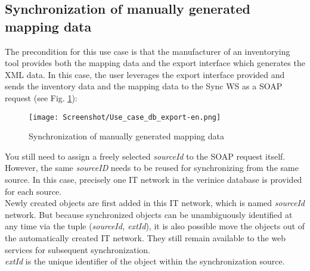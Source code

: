 \documentclass[a4paper,10pt]{book}
\begin{document}
\subsection{Synchronization of manually generated mapping data}
The precondition for this use case is that the manufacturer of an inventorying tool provides both the
mapping data and the export interface which generates the XML data. In this case, the user leverages the export
interface provided and sends the inventory data and the mapping data to the Sync WS as a SOAP request (see Fig. \ref{Synchronization of manually generated mapping data}):
\newline
\begin{figure}[htb!]
  \centering
  \texttt{[image: Screenshot/Use\_case\_db\_export-en.png]}
  \caption{\label{Synchronization of manually generated mapping data} Synchronization of manually generated mapping data}
\end{figure}
\newline
You still need to assign a freely selected {\em sourceId} to the SOAP request itself. However, the same \textit{sourceID}
needs to be reused for synchronizing from the same source. In this case, precisely one IT network in the verinice
database is provided for each source.
\newline\\
Newly created objects are first added in this IT network, which is named {\em sourceId} network.
But because synchronized objects can be unambiguously identified at any time via the tuple ({\em sourceId, extId}),
it is also possible move the objects out of the automatically created IT network. They still remain available to the
web services for subsequent synchronization.
\newline\\
{\em extId} is the unique identifier of the object within the synchronization source.
\end{document}
